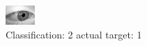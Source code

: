 \begin{figure}[h!]
\begin{center}
\includegraphics[width=0.60\columnwidth]{figures/ID2767_class_2_target_1.png}
\end{center}
\caption{ Classification: 2 actual target: 1}
\label{fig:ID2767_class_2_target_1}
\end{figure}
